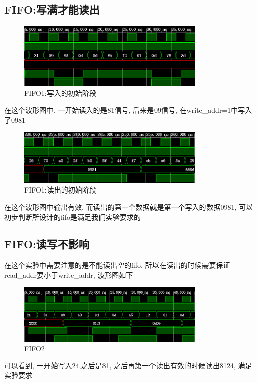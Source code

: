 \documentclass[fontset=windows,12pt]{article}
\begin{document}
\subsection{FIFO:写满才能读出}
    \begin{figure}[!h]
        \centering
        \includegraphics[width=0.8\textwidth]{1.jpg}
        \caption{FIFO1:写入的初始阶段}
    \end{figure}
    在这个波形图中, 一开始读入的是81信号, 后来是09信号, 在write\_addr=1中写入了0981
    \begin{figure}[!h]
        \centering
        \includegraphics[width=0.8\textwidth]{2.jpg}
        \caption{FIFO1:读出的初始阶段}
    \end{figure}
    在这个波形图中输出有效, 而读出的第一个数据就是第一个写入的数据0981, 可以初步判断所设计的fifo是满足我们实验要求的
    \newpage
\subsection{FIFO:读写不影响}
    在这个实验中需要注意的是不能读出空的fifo, 所以在读出的时候需要保证read\_addr要小于write\_addr, 波形图如下
    \begin{figure}[!h]
        \centering
        \includegraphics[width=0.8\textwidth]{3.jpg}
        \caption{FIFO2}
    \end{figure}
    可以看到, 一开始写入24,之后是81, 之后再第一个读出有效的时候读出8124, 满足实验要求
\end{document}
